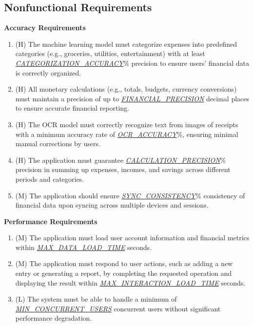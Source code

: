 \documentclass[12pt]{article}
\begin{document}
\newpage


\subsection{Nonfunctional Requirements}

\textbf{Accuracy Requirements}
\begin{enumerate}[label=NFR-ACC-\arabic*]
  \item (H) The machine learning model must categorize expenses into predefined
  categories (e.g., groceries, utilities, entertainment) with at least
  \hyperref[Table:AuxConstants]{\textit{CATEGORIZATION\_ACCURACY}}\% precision
  to ensure users' financial data is correctly organized.
  \item (H) All monetary calculations (e.g., totals, budgets, currency
  conversions) must maintain a precision of up to
  \hyperref[Table:AuxConstants]{\textit{FINANCIAL\_PRECISION}} decimal places to
  ensure accurate financial reporting.
  \item (H) The OCR model must correctly recognize text from images of receipts
  with a minimum accuracy rate of
  \hyperref[Table:AuxConstants]{\textit{OCR\_ACCURACY}}\%, ensuring minimal
  manual corrections by users.
  \item (H) The application must guarantee
  \hyperref[Table:AuxConstants]{\textit{CALCULATION\_PRECISION}}\% precision in
  summing up expenses, incomes, and savings across different periods and
  categories.
  \item (M) The application should ensure
  \hyperref[Table:AuxConstants]{\textit{SYNC\_CONSISTENCY}}\% consistency of
  financial data upon syncing across multiple devices and sessions.
\end{enumerate}

\textbf{Performance Requirements}
\begin{enumerate}[label=NFR-PERF-\arabic*]
  \item (M) The application must load user account information and financial
  metrics within \hyperref[Table:AuxConstants]{\textit{MAX\_DATA\_LOAD\_TIME}} seconds.
  \item (M) The application must respond to user actions, such as adding a new
  entry or generating a report, by completing the requested operation and
  displaying the result within
  \hyperref[Table:AuxConstants]{\textit{MAX\_INTERACTION\_LOAD\_TIME}} seconds.
  \item (L) The system must be able to handle a minimum of
  \hyperref[Table:AuxConstants]{\textit{MIN\_CONCURRENT\_USERS}} concurrent users
  without significant performance degradation.
\end{enumerate}
\end{document}
